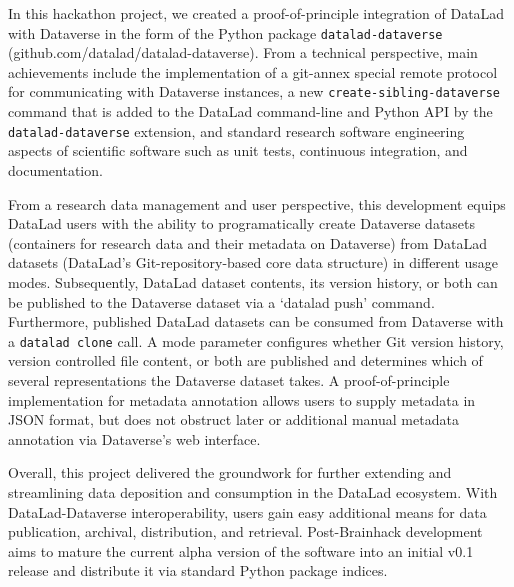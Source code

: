 \documentclass[../main.tex]{subfiles}
\begin{document}
In this hackathon project, we created a proof-of-principle integration of DataLad with Dataverse in the form of the Python package \texttt{datalad-dataverse} (github.com/datalad/datalad-dataverse). From a technical perspective, main achievements include the implementation of a git-annex special remote protocol for communicating with Dataverse instances, a new \texttt{create-sibling-dataverse} command that is added to the DataLad command-line and Python API by the \texttt{datalad-dataverse} extension, and standard research software engineering aspects of scientific software such as unit tests, continuous integration, and documentation.

From a research data management and user perspective, this development equips DataLad users with the ability to programatically create Dataverse datasets (containers for research data and their metadata on Dataverse) from DataLad datasets (DataLad’s Git-repository-based core data structure) in different usage modes. Subsequently, DataLad dataset contents, its version history, or both can be published to the Dataverse dataset via a ‘datalad push’ command. Furthermore, published DataLad datasets can be consumed from Dataverse with a \texttt{datalad clone} call. A mode parameter configures whether Git version history, version controlled file content, or both are published and determines which of several representations the Dataverse dataset takes. A proof-of-principle implementation for metadata annotation allows users to supply metadata in JSON format, but does not obstruct later or additional manual metadata annotation via Dataverse’s web interface.

Overall, this project delivered the groundwork for further extending and streamlining data deposition and consumption in the DataLad ecosystem. With DataLad-Dataverse interoperability, users gain easy additional means for data publication, archival, distribution, and retrieval. Post-Brainhack development aims to mature the current alpha version of the software into an initial v0.1 release and distribute it via standard Python package indices.
\end{document}
